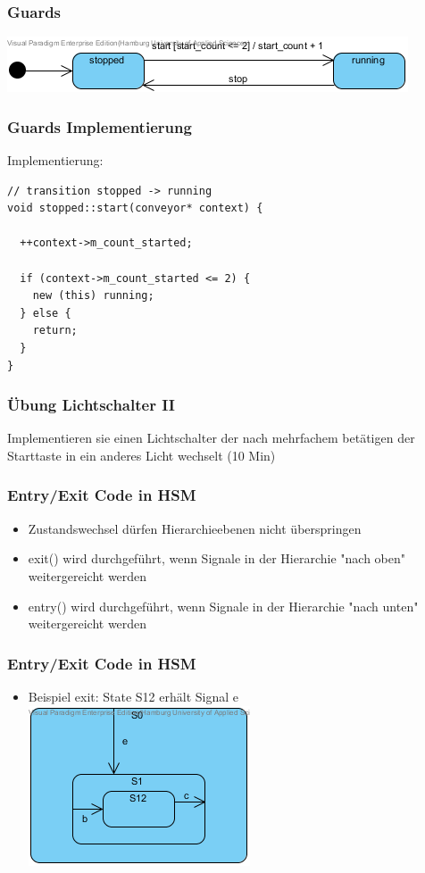 \documentclass{beamer}
\begin{document}
\begin{frame}
 \frametitle{Guards}
 \begin{center}
   \includegraphics[scale=.8]{img/fsm_gof_guard_automat.png}
 \end{center}
\end{frame}

\begin{frame}[fragile]
 \frametitle{Guards Implementierung}
 Implementierung:
 \begin{lstlisting}
// transition stopped -> running
void stopped::start(conveyor* context) {

  ++context->m_count_started;

  if (context->m_count_started <= 2) {
    new (this) running;
  } else {
    return;
  }
}
 \end{lstlisting}
\end{frame}

\begin{frame}
 \frametitle{\"Ubung Lichtschalter II}
 Implementieren sie einen Lichtschalter der nach mehrfachem bet\"atigen der Starttaste in ein anderes Licht wechselt (10 Min)
\end{frame}

\begin{frame}
 \frametitle{Entry/Exit Code in HSM }
 \begin{itemize}
  \item Zustandswechsel d\"urfen Hierarchieebenen nicht \"uberspringen
  \item exit() wird durchgef\"uhrt, wenn Signale in der Hierarchie "nach oben" weitergereicht werden
  \item entry() wird  durchgef\"uhrt, wenn Signale in der Hierarchie "nach unten" weitergereicht werden
 \end{itemize}
\end{frame}

\begin{frame}
 \frametitle{Entry/Exit Code in HSM }
 \begin{itemize}
  \item Beispiel exit: State S12 erh\"alt Signal e\newline\newline
  \includegraphics[scale=.8]{img/beispiel_exitSM}
 \end{itemize}
\end{frame}
\end{document}
